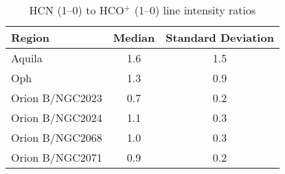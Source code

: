 %
\begin{table}
\centering
\begin{threeparttable}
\caption{HCN (1--0) to HCO$^+$ (1--0) line intensity ratios}  \label{table:hcn_hcop}
\begin{tabular}{lcc}
\hline
Region  & Median & Standard Deviation    \\
\hline
Aquila&   1.6&   1.5\\
Oph&   1.3&   0.9\\
Orion B/NGC2023&   0.7&   0.2\\
Orion B/NGC2024&   1.1&   0.3\\
Orion B/NGC2068&   1.0&   0.3\\
Orion B/NGC2071&   0.9&   0.2\\
\hline
\end{tabular}
\end{threeparttable}
\end{table}
